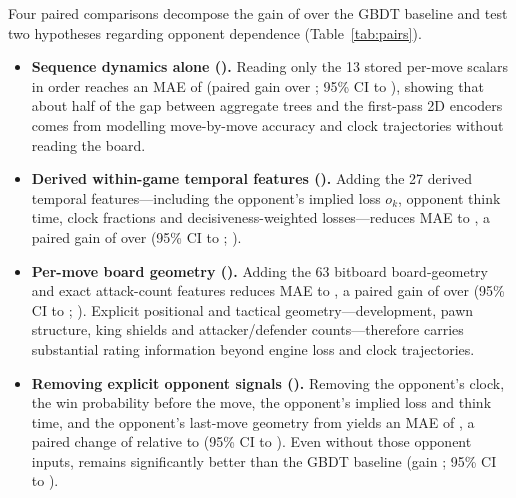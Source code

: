 \documentclass[11pt]{article}
\begin{document}
Four paired comparisons decompose the gain of  over the GBDT
baseline and test two hypotheses regarding opponent dependence
(Table~\ref{tab:pairs}).
\begin{itemize}
\item \textbf{Sequence dynamics alone ().} Reading only the 13
stored per-move scalars in order reaches an MAE of 
(paired gain  over ; 95\% CI
 to ), showing that
about half of the gap between aggregate trees and the first-pass 2D encoders
comes from modelling move-by-move accuracy and clock trajectories without
reading the board.
\item \textbf{Derived within-game temporal features ().}
Adding the 27 derived temporal features---including the opponent's implied
loss $o_k$, opponent think time, clock fractions and decisiveness-weighted
losses---reduces MAE to , a paired gain of
 over  (95\% CI
 to
;
).
\item \textbf{Per-move board geometry ().} Adding the 63
bitboard board-geometry and exact attack-count features reduces MAE to
, a paired gain of
 over  (95\% CI
 to
;
). Explicit positional and tactical
geometry---development, pawn structure, king shields and attacker/defender
counts---therefore carries substantial rating information beyond engine loss
and clock trajectories.
\item \textbf{Removing explicit opponent signals ().}
Removing the opponent's clock, the win probability before the move, the
opponent's implied loss and think time, and the opponent's last-move geometry
from  yields an MAE of , a
paired change of  relative to
 (95\% CI  to
). Even without those opponent
inputs,  remains significantly better than the GBDT
baseline (gain ; 95\% CI
 to ).

\end{itemize}
\end{document}
